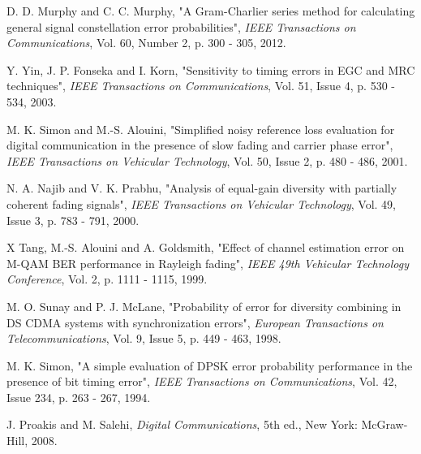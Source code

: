 
%
%
%
%
%
%

\begin{thebibliography}{99}

\bibitem{[1]}
D. D. Murphy and C. C. Murphy, "A Gram-Charlier series method for calculating general signal constellation error probabilities", \emph{IEEE Transactions on Communications}, Vol. 60, Number 2, p. 300 - 305, 2012.

\bibitem{[2]}
Y. Yin, J. P. Fonseka and I. Korn, "Sensitivity to timing errors in EGC and MRC techniques", \emph{IEEE Transactions on Communications}, Vol. 51, Issue 4, p. 530 - 534, 2003.

\bibitem{[3]}
M. K. Simon and M.-S. Alouini, "Simplified noisy reference loss evaluation for digital communication in the presence of slow fading and carrier phase error", \emph{IEEE Transactions on Vehicular Technology}, Vol. 50, Issue 2, p. 480 - 486, 2001.

\bibitem{[4]}
N. A. Najib and V. K. Prabhu, "Analysis of equal-gain diversity with partially coherent fading signals", \emph{IEEE Transactions on Vehicular Technology}, Vol. 49, Issue 3, p. 783 - 791, 2000.

\bibitem{[5]}
X Tang, M.-S. Alouini and A. Goldsmith, "Effect of channel estimation error on M-QAM BER performance in Rayleigh fading", \emph{IEEE 49th Vehicular Technology Conference}, Vol. 2, p. 1111 - 1115, 1999.

\bibitem{[6]}
M. O. Sunay and P. J. McLane, "Probability of error for diversity combining in DS CDMA systems with synchronization errors", \emph{European Transactions on Telecommunications}, Vol. 9, Issue 5, p. 449 - 463, 1998.

\bibitem{[7]}
M. K. Simon, "A simple evaluation of DPSK error probability performance in the presence of bit timing error", \emph{IEEE Transactions on Communications}, Vol. 42, Issue 234, p. 263 - 267, 1994.

\bibitem{[8]}
J. Proakis and M. Salehi, \emph{Digital Communications}, 5th ed., New York: McGraw-Hill, 2008.


\end{thebibliography}
